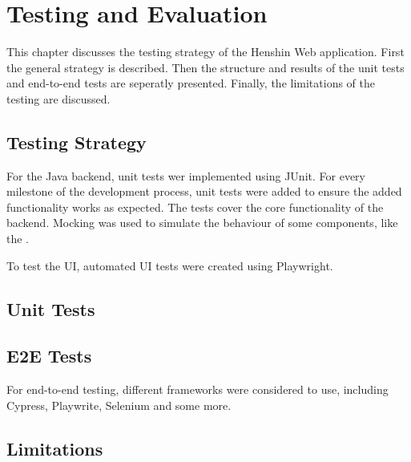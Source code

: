 \chapter{Testing and Evaluation}
  \label{sec:testing}

  This chapter discusses the testing strategy of the Henshin Web application. First the general strategy is described. Then the structure and results of the unit tests and end-to-end tests are seperatly presented. Finally, the limitations of the testing are discussed.

  \section{Testing Strategy}
  \label{subsec:testing-strategy}

  For the Java backend, unit tests wer implemented using JUnit. For every milestone of the development process, unit tests were added to ensure the added functionality works as expected. The tests cover the core functionality of the backend. Mocking was used to simulate the behaviour of some components, like the .

  To test the UI, automated UI tests were created using Playwright.

  \section{Unit Tests}
  \label{subsec:test-results}

  \section{E2E Tests}
  \label{subsec:performance-evaluation}

  For end-to-end testing, different frameworks were considered to use, including Cypress, Playwrite, Selenium and some more.

  \section{Limitations}
  \label{subsec:user-feedback}